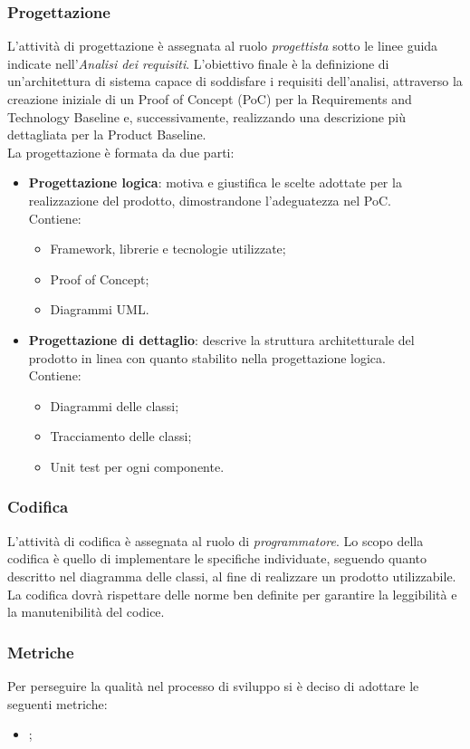         \subsubsection{Progettazione}
        L'attività di progettazione è assegnata al ruolo \textit{progettista} sotto le linee guida indicate nell'\textit{Analisi dei requisiti}. L'obiettivo finale è la definizione di un'architettura di sistema capace di soddisfare i requisiti dell'analisi, 
        attraverso la creazione iniziale di un Proof of Concept (PoC) per la Requirements and Technology Baseline e, successivamente, realizzando una descrizione più dettagliata per la Product Baseline.
        \\La progettazione è formata da due parti:
        \begin{itemize}
            \item \textbf{Progettazione logica}: motiva e giustifica le scelte adottate per la realizzazione del prodotto, dimostrandone l’adeguatezza nel PoC.
            \\Contiene:
            \renewcommand{\labelitemii}{-}
            \begin{itemize}
                \item Framework, librerie e tecnologie utilizzate;
                \item Proof of Concept;
                \item Diagrammi UML.
            \end{itemize}
            \item \textbf{Progettazione di dettaglio}: descrive la struttura architetturale del prodotto in linea con quanto stabilito nella progettazione logica.\\
            Contiene:
            \renewcommand{\labelitemii}{-}
            \begin{itemize}
                \item Diagrammi delle classi;
                \item Tracciamento delle classi;
                \item Unit test per ogni componente.
            \end{itemize}
        \end{itemize}
        
        \subsubsection{Codifica}
        L'attività di codifica è assegnata al ruolo di \textit{programmatore}. Lo scopo della codifica è quello di implementare le specifiche individuate, seguendo quanto descritto nel diagramma delle classi, al fine di realizzare un prodotto utilizzabile.
        \\La codifica dovrà rispettare delle norme ben definite per garantire la leggibilità e la manutenibilità del codice.

        \subsubsection{Metriche}
        Per perseguire la qualità nel processo di sviluppo si è deciso di adottare le seguenti metriche:
        \begin{itemize}
                \item {};
        \end{itemize}






